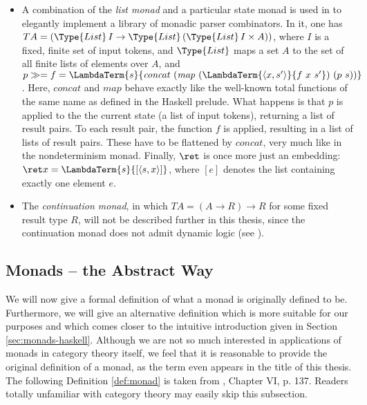 \begin{itemize}
\item A combination of the \emph{list monad} and a particular state monad is
  used in \cite{HuttonMeijer96} to elegantly implement a library of monadic
  parser combinators. In it, one has\\
  $T A = (\Type{List}\, I \to \Type{List}\, (\Type{List}\, I \times A))$, where $I$ is
  a fixed, finite set of input tokens, and $\Type{List}$ maps a set $A$ to the
  set
  of all finite lists of elements over $A$, and \\
  $p \gg= f = \LambdaTerm{s}{\mathit{concat}\ (\mathit{map}\
    (\LambdaTerm{\langle x,s'\rangle}{f\ x\ s'})\ (p\ s))}$. Here, $\mathit{concat}$ and
  $\mathit{map}$ behave exactly like the well-known total functions of the same
  name as defined in the Haskell prelude. What happens is that $p$ is applied to
  the the current state (a list of input tokens), returning a list of result
  pairs. To each result pair, the function $f$ is applied, resulting in a list
  of lists of result pairs. These have to be flattened by $\mathit{concat}$,
  very much like in the nondeterminism monad. Finally, $\ret$ is once more just
  an embedding:\\
  $\ret x = \LambdaTerm{s}{\left[\langle s, x\rangle\right]}$, where $[e]$ denotes the
  list containing exactly one element $e$.

\item The \emph{continuation monad}, in which $T A = (A \to R) \to R$ for some fixed
  result type $R$, will not be described further in this thesis, since the
  continuation monad does not admit dynamic logic (see
  \cite{SchroederMossakowski:PDL}). 
\end{itemize}


\subsection{Monads -- the Abstract Way}
\label{sec:monads-categ-theory}

We will now give a formal definition of what a monad is originally defined to
be. Furthermore, we will give an alternative definition which is more suitable
for our purposes and which comes closer to the intuitive introduction given in
Section \ref{sec:monads-haskell}. Although we are not so much interested in
applications of monads in category theory itself, we feel that it is reasonable
to provide the original definition of a monad, as the term even appears in the
title of this thesis. The following Definition \ref{def:monad} is taken from
\cite{MacLane98}, Chapter VI, p. 137. Readers totally unfamiliar with category
theory may easily skip this subsection.

